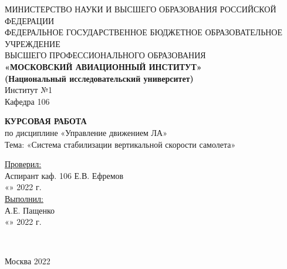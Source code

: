\begin{center}
    \hfill \break
    \large{МИНИСТЕРСТВО НАУКИ И ВЫСШЕГО ОБРАЗОВАНИЯ РОССИЙСКОЙ ФЕДЕРАЦИИ }\\
    \footnotesize{ФЕДЕРАЛЬНОЕ ГОСУДАРСТВЕННОЕ БЮДЖЕТНОЕ ОБРАЗОВАТЕЛЬНОЕ УЧРЕЖДЕНИЕ}\\ 
    \footnotesize{ВЫСШЕГО ПРОФЕССИОНАЛЬНОГО ОБРАЗОВАНИЯ}\\
    \small{\textbf{«МОСКОВСКИЙ АВИАЦИОННЫЙ ИНСТИТУТ»\\(Национальный исследовательский университет)}}\\ \hline
    \hfill \break
    \normalsize{Институт №1}\\
    \normalsize{Кафедра 106}\\
    \hfill\break

    \large{\textbf{КУРСОВАЯ РАБОТА} \\ по дисциплине «Управление движением ЛА» }\\

    \normalsize{Тема: «Система стабилизации вертикальной скорости самолета»}\\
\end{center}
\hfill \break

\normalsize{ 
\begin{flushleft}
    \underline{Проверил:} \\
    \hfill \break  
    Аспирант каф. 106 Е.В. Ефремов \\ \hfill \break
    «\underline{\hspace{1cm}}» \underline{\hspace{3cm}} 2022 г. \\ \hfill \break
    \underline{Выполнил:} \\ \hfill \break 
    А.Е. Пащенко \\
    «\underline{\hspace{1cm}}» \underline{\hspace{3cm}} 2022 г. \\ \hfill \break
\end{flushleft}
}\\

\begin{center} Москва 2022 \end{center}
\thispagestyle{empty} %
 
